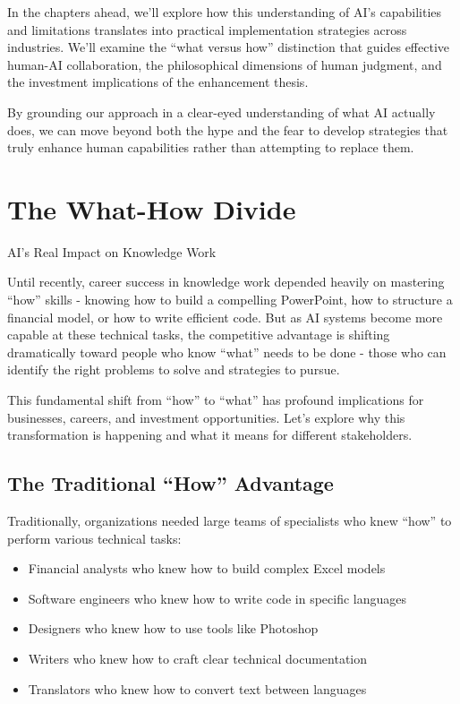\documentclass[
  Letterpaper,
]{scrbook}
\providecommand{\tightlist}{%
  \setlength{\itemsep}{0pt}\setlength{\parskip}{0pt}}\usepackage{longtable,booktabs,array}
\begin{document}
In the chapters ahead, we'll explore how this understanding of AI's
capabilities and limitations translates into practical implementation
strategies across industries. We'll examine the ``what versus how''
distinction that guides effective human-AI collaboration, the
philosophical dimensions of human judgment, and the investment
implications of the enhancement thesis.

By grounding our approach in a clear-eyed understanding of what AI
actually does, we can move beyond both the hype and the fear to develop
strategies that truly enhance human capabilities rather than attempting
to replace them.


\chapter{The What-How Divide}\label{the-what-how-divide}

AI's Real Impact on Knowledge Work

\hfill\break

Until recently, career success in knowledge work depended heavily on
mastering ``how'' skills - knowing how to build a compelling PowerPoint,
how to structure a financial model, or how to write efficient code. But
as AI systems become more capable at these technical tasks, the
competitive advantage is shifting dramatically toward people who know
``what'' needs to be done - those who can identify the right problems to
solve and strategies to pursue.

This fundamental shift from ``how'' to ``what'' has profound
implications for businesses, careers, and investment opportunities.
Let's explore why this transformation is happening and what it means for
different stakeholders.

\section{The Traditional ``How''
Advantage}\label{the-traditional-how-advantage}

Traditionally, organizations needed large teams of specialists who knew
``how'' to perform various technical tasks:

\begin{itemize}
\tightlist
\item
  Financial analysts who knew how to build complex Excel models
\item
  Software engineers who knew how to write code in specific languages
\item
  Designers who knew how to use tools like Photoshop
\item
  Writers who knew how to craft clear technical documentation
\item
  Translators who knew how to convert text between languages
\end{itemize}
\end{document}
